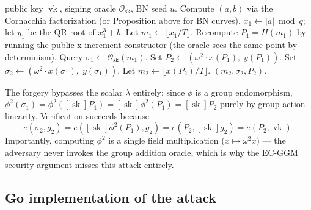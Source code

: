 \documentclass[11pt,a4paper]{article}
\theoremstyle{definition}
\DeclareMathOperator{\sk}{sk}
\DeclareMathOperator{\vk}{vk}
\begin{document}
\begin{algorithm}[H]
\caption{Existential BLS signature forgery on a $j=0$ curve}
\label{alg:forgery}
\begin{algorithmic}[1]
\Require public key $\vk$, signing oracle $\mathcal{O}_{\sk}$, BN seed $u$.
\State Compute $(a,b)$ via the Cornacchia factorization (or
Proposition above for BN curves).
\State $x_1 \gets |a| \bmod q$; let $y_1$ be the QR root of $x_1^3 + b$.
\State Let $m_1 \gets \lfloor x_1 / T \rfloor$.
\State Recompute $P_1 = H(m_1)$ by running the public x-increment
constructor (the oracle sees the same point by determinism).
\State Query $\sigma_1 \gets \mathcal{O}_{\sk}(m_1)$.
\State {}
\State Set $P_2 \gets (\omega^2 \cdot x(P_1),\; y(P_1))$.
\State Set $\sigma_2 \gets (\omega^2 \cdot x(\sigma_1),\; y(\sigma_1))$.
\State Let $m_2 \gets \lfloor x(P_2) / T \rfloor$.
\State \Return $(m_2, \sigma_2, P_2)$.
\end{algorithmic}
\end{algorithm}

The forgery bypasses the scalar $\lambda$ entirely: since $\phi$ is a group
endomorphism, $\phi^2(\sigma_1) = \phi^2([\sk] P_1) = [\sk]\phi^2(P_1) =
[\sk] P_2$ purely by group-action linearity. Verification succeeds because
\[
  e(\sigma_2, g_2)
  = e([\sk]\phi^2(P_1), g_2)
  = e(P_2, [\sk] g_2)
  = e(P_2, \vk).
\]
Importantly, computing $\phi^2$ is a single field multiplication ($x \mapsto
\omega^2 x$) — the adversary never invokes the group addition oracle, which
is why the EC-GGM security argument misses this attack entirely.

\subsection{Go implementation of the attack}
\end{document}
